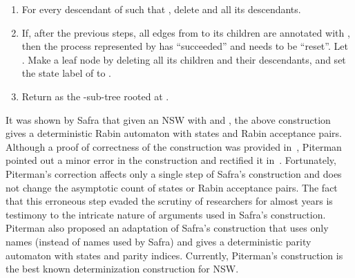 \documentclass[3p]{elsarticle}
\begin{document}
{\begin{enumerate}
\begin{enumerate}
    \item If , remove  from the state labels of all leaves of
      the sub-tree rooted at .
      
    \item If  and  is to the left of , remove  
      from the state labels of all leaves of the sub-tree rooted at .
      
    \end{enumerate} 
    
  \item \label{safra5} For every descendant  of  such that
    , delete  and all its descendants.
    
  \item \label{safra6} If, after the previous steps, all edges from
     to its children are annotated with , then the process
    represented by  has ``succeeded'' and needs to be ``reset''.
    Let .  Make  a leaf node by deleting all its
    children and their descendants, and set the state label of  to .
    
  \item \label{safra7} Return  as the -sub-tree rooted at .
  \end{enumerate}
}

It was shown by Safra that given an NSW with  and ,
the above construction gives a deterministic Rabin automaton with
 states and  Rabin
acceptance pairs.  Although a proof of correctness of the construction
was provided in~\cite{safra-stoc92,safra06,2001automata}, Piterman
pointed out a minor error in the construction and rectified it
in~\cite{piterman}.  Fortunately, Piterman's correction affects only a
single step of Safra's construction and does not change the asymptotic
count of states or Rabin acceptance pairs.  The fact that this
erroneous step evaded the scrutiny of researchers for almost 
years is testimony to the intricate nature of arguments used in
Safra's construction.  Piterman also proposed an adaptation of Safra's
construction that uses only  names (instead of  names used by Safra) and gives a deterministic parity
automaton with  states and
 parity indices.  Currently, Piterman's construction
is the best known determinization construction for NSW.
\end{document}
